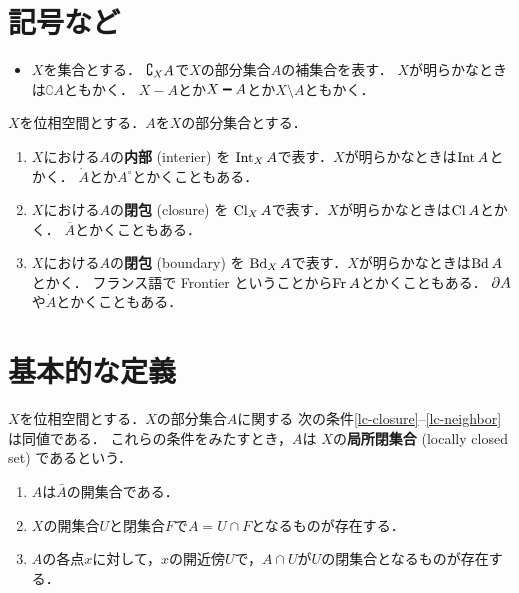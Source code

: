 \section*{記号など}
\begin{itemize}
    \item \(X\)を集合とする．
    \(\dip \complement_X A\)で\(X\)の部分集合\(A\)の補集合を表す．
    \(X\)が明らかなときは\(\complement{A}\)ともかく．
    \(X-A\)とか\(X\smi A\)とか\(X\setminus A\)ともかく．
\end{itemize}

\(X\)を位相空間とする．\(A\)を\(X\)の部分集合とする．
\begin{enumerate}
    \item \(X\)における\(A\)の\textbf{内部} (interier) を
    \(\Int[X]A\)で表す．\(X\)が明らかなときは\(\Int{A}\)とかく．
    \(\mathring{A}\)とか\(A^{\circ}\)とかくこともある．
    \item \(X\)における\(A\)の\textbf{閉包} (closure) を
    \(\Cl[X]A\)で表す．\(X\)が明らかなときは\(\Cl{A}\)とかく．
    \(\overline{A}\)とかくこともある．
    \item \(X\)における\(A\)の\textbf{閉包} (boundary) を
    \(\Bd[X]A\)で表す．\(X\)が明らかなときは\(\Bd{A}\)とかく．
    フランス語で Frontier ということから\(\Fr A\)とかくこともある．
    \(\p{A}\)や\(\dot{A}\)とかくこともある．
\end{enumerate}


\section{基本的な定義}







\begin{leftbar}
\begin{DFN}
    \(X\)を位相空間とする．\(X\)の部分集合\(A\)に関する
    次の条件\eqref{lc-closure}--\eqref{lc-neighbor}は同値である．
    これらの条件をみたすとき，\(A\)は
    \(X\)の\textbf{局所閉集合} (locally closed set) であるという．
    \begin{enumerate}[(1)]
        \item \(A\)は\(\bar{A}\)の開集合である．\label{lc-closure}
        \item \(X\)の開集合\(U\)と閉集合\(F\)で\(A=U\cap F\)となるものが存在する．\label{lc-intersection}
        \item \(A\)の各点\(x\)に対して，\(x\)の開近傍\(U\)で，\(A\cap U\)が\(U\)の閉集合となるものが存在する．\label{lc-neighbor}
    \end{enumerate}
\end{DFN}
\end{leftbar}

